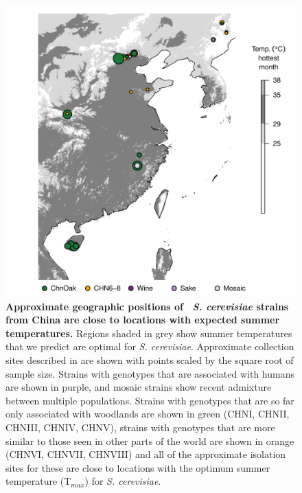 \documentclass[12pt]{article}
\begin{document}
\begin{figure}[h!] \centering
\includegraphics[width=1\textwidth]{../figs_tables/FigureS1China.pdf}
\caption{{\bf Approximate geographic positions of \suppfigstrains\ \textit{S. cerevisiae} strains from China are close to locations with expected summer temperatures.} Regions shaded in grey show summer temperatures that we predict are optimal for \textit{S. cerevisiae}. Approximate collection sites described in \citet{wang_surprisingly_2012} are shown with points scaled by the square root of sample size. Strains with genotypes that are associated with humans are shown in purple, and mosaic strains show recent admixture between multiple populations. Strains with genotypes that are so far only associated with woodlands are shown in green (CHNI, CHNII, CHNIII, CHNIV, CHNV), strains with genotypes that are more similar to those seen in other parts of the world are shown in orange (CHNVI, CHNVII, CHNVIII) and all of the approximate isolation sites for these are close to locations with the optimum summer temperature (T$_{max}$) for \textit{S. cerevisiae}. }
\label{fig:china} 
\end{figure}
\clearpage


{\footnotesize \linespread{1}
}
\clearpage
\end{document}

